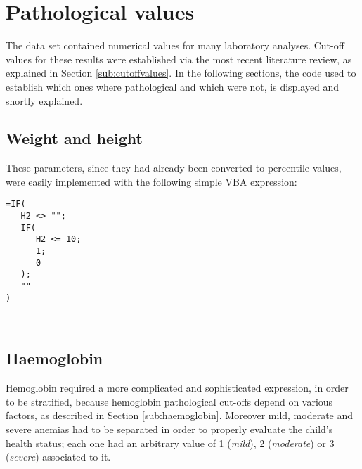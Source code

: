 \section{Pathological values}\label{sec:pathologicalvalues}
The data set contained numerical values for many laboratory analyses. Cut-off values for these results were established via the most recent literature review, as explained in Section \ref{sub:cutoffvalues}. In the following sections, the code used to establish which ones where pathological and which were not, is displayed and shortly explained.

\subsection{Weight and height}\label{sub:patweightandheight}
These parameters, since they had already been converted to percentile values, were easily implemented with the following simple VBA expression:

\begin{minipage}{\linewidth}
\begin{lstlisting}
=IF(
   H2 <> "";
   IF(
      H2 <= 10;
      1;
      0
   );
   ""
)
\end{lstlisting}\
\end{minipage}

\subsection{Haemoglobin}\label{sub:pathaemoglobin}
Hemoglobin required a more complicated and sophisticated expression, in order to be stratified, because hemoglobin pathological cut-offs depend on various factors, as described in Section \ref{sub:haemoglobin}. Moreover mild, moderate and severe anemias had to be separated in order to properly evaluate the child's health status; each one had an arbitrary value of 1 (\textit{mild}), 2 (\textit{moderate}) or 3 (\textit{severe}) associated to it.

